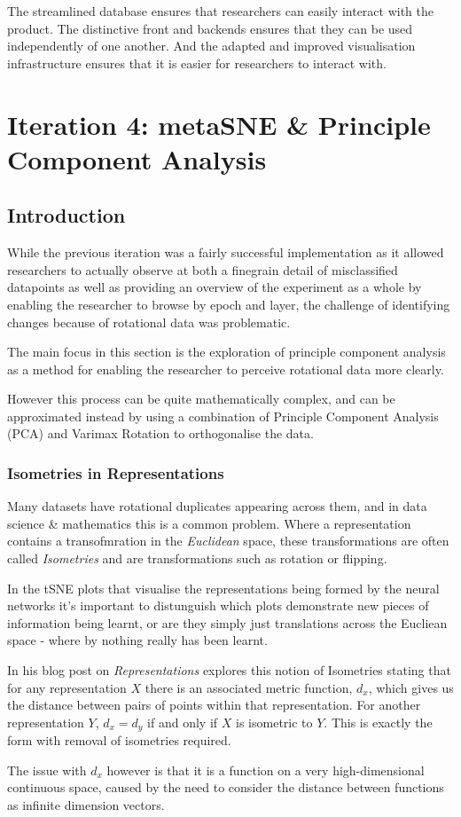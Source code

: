 \documentclass[a4paper,11pt,titlepage]{article}
\begin{document}
	\par 
	The streamlined database ensures that researchers can easily interact with the product. The distinctive front and backends ensures that they can be used independently of one another. And the adapted and improved visualisation infrastructure ensures that it is easier for researchers to interact with.
	
	
\section{Iteration 4: metaSNE \& Principle Component Analysis}
	
	\subsection{Introduction}
	While the previous iteration was a fairly successful implementation as it allowed researchers to actually observe at both a finegrain detail of misclassified datapoints as well as providing an overview of the experiment as a whole by enabling the researcher to browse by epoch and layer, the challenge of identifying changes because of rotational data was problematic.
	\par 
	The main focus in this section is the exploration of principle component analysis as a method for enabling the researcher to perceive rotational data more clearly. 
	\par 
	However this process can be quite mathematically complex, and can be approximated instead by using a combination of Principle Component Analysis (PCA) and Varimax Rotation to orthogonalise the data. 	
	\par 

	\subsubsection{Isometries in Representations}
	Many datasets have rotational duplicates appearing across them, and in data science \& mathematics this is a common problem. Where a representation contains a transofmration in the \textit{Euclidean} space, these transformations are often called \textit{Isometries} and are transformations such as rotation or flipping. 
	\par 
	In the tSNE plots that visualise the representations being formed by the neural networks it's important to distunguish which plots demonstrate new pieces of information being learnt, or are they simply just translations across the Eucliean space - where by nothing really has been learnt.
	\par 
	In his blog post on \textit{Representations} \cite{Olah2014} explores this notion of Isometries stating that for any representation $ X $ there is an associated metric function, $ d_{x} $, which gives us the distance between pairs of points within that representation. For another representation $ Y $, $ d_{x} = d_{y} $ if and only if $ X $ is isometric to $ Y $. This is exactly the form with removal of isometries required.
		\par 
		The issue with $ d_{x} $ however is that it is a function on a very high-dimensional continuous space, caused by the need to consider the distance between functions as infinite dimension vectors.
		 
\end{document}
